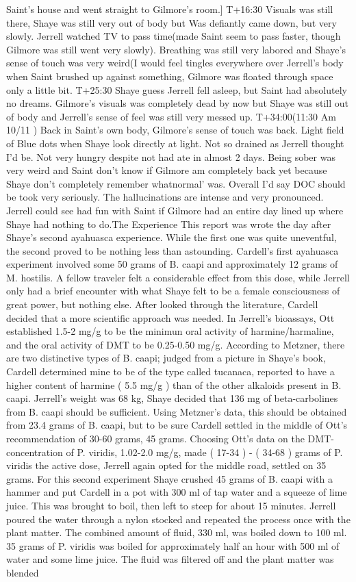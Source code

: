 \documentclass[12pt]{book}
\begin{document}
Saint's house and went straight to Gilmore's room.] T+16:30 Visuals was still there, Shaye was still very out of body but Was defiantly came down, but very slowly. Jerrell watched TV to pass time(made Saint seem to pass faster, though Gilmore was still went very slowly). Breathing was still very labored and Shaye's sense of touch was very weird(I would feel tingles everywhere over Jerrell's body when Saint brushed up against something, Gilmore was floated through space only a little bit. T+25:30 Shaye guess Jerrell fell asleep, but Saint had absolutely no dreams. Gilmore's visuals was completely dead by now but Shaye was still out of body and Jerrell's sense of feel was still very messed up. T+34:00(11:30 Am 10/11 ) Back in Saint's own body, Gilmore's sense of touch was back. Light field of Blue dots when Shaye look directly at light. Not so drained as Jerrell thought I'd be. Not very hungry despite not had ate in almost 2 days. Being sober was very weird and Saint don't know if Gilmore am completely back yet because Shaye don't completely remember whatnormal' was. Overall I'd say DOC should be took very seriously. The hallucinations are intense and very pronounced. Jerrell could see had fun with Saint if Gilmore had an entire day lined up where Shaye had nothing to do.The Experience This report was wrote the day after Shaye's second ayahuasca experience. While the first one was quite uneventful, the second proved to be nothing less than astounding. Cardell's first ayahuasca experiment involved some 50 grams of B. caapi and approximately 12 grams of M. hostilis. A fellow traveler felt a considerable effect from this dose, while Jerrell only had a brief encounter with what Shaye felt to be a female consciousness of great power, but nothing else. After looked through the literature, Cardell decided that a more scientific approach was needed. In Jerrell's bioassays, Ott established 1.5-2 mg/g to be the minimun oral activity of harmine/harmaline, and the oral activity of DMT to be 0.25-0.50 mg/g. According to Metzner, there are two distinctive types of B. caapi; judged from a picture in Shaye's book, Cardell determined mine to be of the type called tucanaca, reported to have a higher content of harmine ( 5.5 mg/g ) than of the other alkaloids present in B. caapi. Jerrell's weight was 68 kg, Shaye decided that 136 mg of beta-carbolines from B. caapi should be sufficient. Using Metzner's data, this should be obtained from 23.4 grams of B. caapi, but to be sure Cardell settled in the middle of Ott's recommendation of 30-60 grams, 45 grams. Choosing Ott's data on the DMT-concentration of P. viridis, 1.02-2.0 mg/g, made ( 17-34 ) - ( 34-68 ) grams of P. viridis the active dose, Jerrell again opted for the middle road, settled on 35 grams. For this second experiment Shaye crushed 45 grams of B. caapi with a hammer and put Cardell in a pot with 300 ml of tap water and a squeeze of lime juice. This was brought to boil, then left to steep for about 15 minutes. Jerrell poured the water through a nylon stocked and repeated the process once with the plant matter. The combined amount of fluid, 330 ml, was boiled down to 100 ml. 35 grams of P. viridis was boiled for approximately half an hour with 500 ml of water and some lime juice. The fluid was filtered off and the plant matter was blended 
\end{document}
